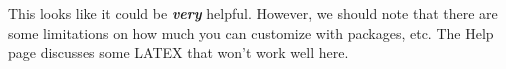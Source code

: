 This looks like it could be \textbf{\textit{very}} helpful. However, we should note that there are some limitations on how much you can customize with packages, etc. The Help page discusses some LATEX that won't work well here. 
  
  
  
  